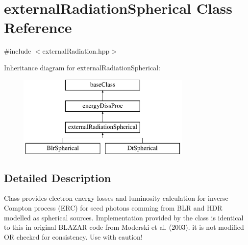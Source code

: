 \hypertarget{classexternalRadiationSpherical}{\section{external\-Radiation\-Spherical Class Reference}
\label{classexternalRadiationSpherical}
}


{\ttfamily \#include $<$external\-Radiation.\-hpp$>$}

Inheritance diagram for external\-Radiation\-Spherical\-:\begin{figure}[H]
\begin{center}
\leavevmode
\includegraphics[height=4.000000cm]{classexternalRadiationSpherical}
\end{center}
\end{figure}


\subsection{Detailed Description}
Class provides electron energy losses and luminosity calculation for inverse Compton process (E\-R\-C) for seed photons comming from B\-L\-R and H\-D\-R modelled as spherical sources. Implementation provided by the class is identical to this in original B\-L\-A\-Z\-A\-R code from Moderski et al. (2003). it is not modified O\-R checked for consistency. Use with caution!

